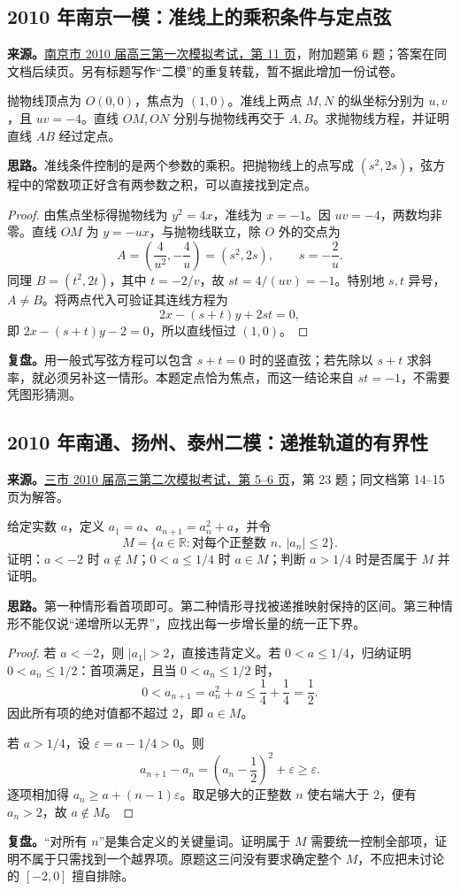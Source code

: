 \documentclass[UTF8]{ctexart}
\begin{document}
\subsection{2010 年南京一模：准线上的乘积条件与定点弦}\label{sec:c2010nj1}
\textbf{来源。}\href{https://doc.xuehai.net/b9a0d69dda6b154ccecee1997-11.html}{南京市 2010 届高三第一次模拟考试，第 11 页}，附加题第 6 题；答案在同文档后续页。另有标题写作“二模”的重复转载，暂不据此增加一份试卷。
\begin{example}[题意]
抛物线顶点为 $O(0,0)$，焦点为 $(1,0)$。准线上两点 $M,N$ 的纵坐标分别为 $u,v$，且 $uv=-4$。直线 $OM,ON$ 分别与抛物线再交于 $A,B$。求抛物线方程，并证明直线 $AB$ 经过定点。
\end{example}
\textbf{思路。}准线条件控制的是两个参数的乘积。把抛物线上的点写成 $(s^2,2s)$，弦方程中的常数项正好含有两参数之积，可以直接找到定点。
\begin{proof}
由焦点坐标得抛物线为 $y^2=4x$，准线为 $x=-1$。因 $uv=-4$，两数均非零。直线 $OM$ 为 $y=-ux$，与抛物线联立，除 $O$ 外的交点为
\[
A=\left(\frac4{u^2},-\frac4u\right)=(s^2,2s),\qquad s=-\frac2u.
\]
同理 $B=(t^2,2t)$，其中 $t=-2/v$，故 $st=4/(uv)=-1$。特别地 $s,t$ 异号，$A\ne B$。将两点代入可验证其连线方程为
\[
2x-(s+t)y+2st=0,
\]
即 $2x-(s+t)y-2=0$，所以直线恒过 $(1,0)$。
\end{proof}
\textbf{复盘。}用一般式写弦方程可以包含 $s+t=0$ 时的竖直弦；若先除以 $s+t$ 求斜率，就必须另补这一情形。本题定点恰为焦点，而这一结论来自 $st=-1$，不需要凭图形猜测。

\subsection{2010 年南通、扬州、泰州二模：递推轨道的有界性}\label{sec:c2010nty2}
\textbf{来源。}\href{https://doc.xuehai.net/b0564b8cf950bcb418f9af425-5.html}{三市 2010 届高三第二次模拟考试，第 5--6 页}，第 23 题；同文档第 14--15 页为解答。
\begin{example}[题意]
给定实数 $a$，定义 $a_1=a$、$a_{n+1}=a_n^2+a$，并令
\[
M=\{a\in\mathbb R:\text{对每个正整数 }n,\ |a_n|\leq2\}.
\]
证明：$a<-2$ 时 $a\notin M$；$0<a\leq1/4$ 时 $a\in M$；判断 $a>1/4$ 时是否属于 $M$ 并证明。
\end{example}
\textbf{思路。}第一种情形看首项即可。第二种情形寻找被递推映射保持的区间。第三种情形不能仅说“递增所以无界”，应找出每一步增长量的统一正下界。
\begin{proof}
若 $a<-2$，则 $|a_1|>2$，直接违背定义。若 $0<a\leq1/4$，归纳证明 $0<a_n\leq1/2$：首项满足，且当 $0<a_n\leq1/2$ 时，
\[
0<a_{n+1}=a_n^2+a\leq\frac14+\frac14=\frac12.
\]
因此所有项的绝对值都不超过 $2$，即 $a\in M$。

若 $a>1/4$，设 $\varepsilon=a-1/4>0$。则
\[
a_{n+1}-a_n=\left(a_n-\frac12\right)^2+\varepsilon\geq\varepsilon.
\]
逐项相加得 $a_n\geq a+(n-1)\varepsilon$。取足够大的正整数 $n$ 使右端大于 $2$，便有 $a_n>2$，故 $a\notin M$。
\end{proof}
\textbf{复盘。}“对所有 $n$”是集合定义的关键量词。证明属于 $M$ 需要统一控制全部项，证明不属于只需找到一个越界项。原题这三问没有要求确定整个 $M$，不应把未讨论的 $[-2,0]$ 擅自排除。
\end{document}
